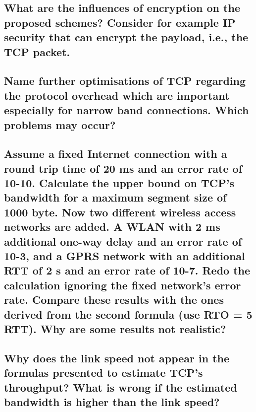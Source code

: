 \subsection{What are the influences of encryption on the proposed schemes? Consider for
example IP security that can encrypt the payload, i.e., the TCP packet.}

\subsection{Name further optimisations of TCP regarding the protocol overhead which are
important especially for narrow band connections. Which problems may occur?}

\subsection{Assume a fixed Internet connection with a round trip time of 20 ms and an error rate
of 10-10. Calculate the upper bound on TCP’s bandwidth for a maximum segment size
of 1000 byte. Now two different wireless access networks are added. A WLAN with 2
ms additional one-way delay and an error rate of 10-3, and a GPRS network with an
additional RTT of 2 s and an error rate of 10-7. Redo the calculation ignoring the fixed
network’s error rate. Compare these results with the ones derived from the second
formula (use RTO = 5 RTT). Why are some results not realistic?}

\subsection{Why does the link speed not appear in the formulas presented to estimate TCP’s
throughput? What is wrong if the estimated bandwidth is higher than the link speed?}




